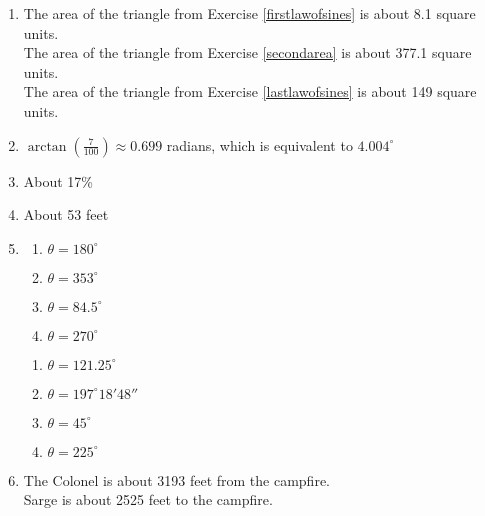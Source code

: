 \begin{enumerate}

\setcounter{enumi}{\value{HW}}

\item The area of the triangle from Exercise \ref{firstlawofsines} is about 8.1 square units.\\
The area of the triangle from Exercise \ref{secondarea} is about 377.1 square units.\\
The area of the triangle from Exercise \ref{lastlawofsines} is about 149 square units.

\item $\arctan\left(\frac{7}{100}\right) \approx 0.699$ radians, which is equivalent to $4.004^{\circ}$
\item About 17\%
\item About 53 feet

\pagebreak

\item \begin{multicols}{4} \begin{enumerate}

\item $\theta = 180^{\circ}$
\item $\theta = 353^{\circ}$
\item $\theta = 84.5^{\circ}$
\item $\theta = 270^{\circ}$

\setcounter{HWindent}{\value{enumii}}

\end{enumerate}

\end{multicols}

\begin{multicols}{4} 

\begin{enumerate}

\setcounter{enumii}{\value{HWindent}}

\item $\theta = 121.25^{\circ}$
\item $\theta = 197^{\circ} 18' 48''$
\item $\theta = 45^{\circ}$
\item $\theta = 225^{\circ}$

\end{enumerate}

\end{multicols}

\item  The Colonel is about 3193 feet from the campfire. \\
Sarge is about 2525 feet to the campfire.


\end{enumerate}
